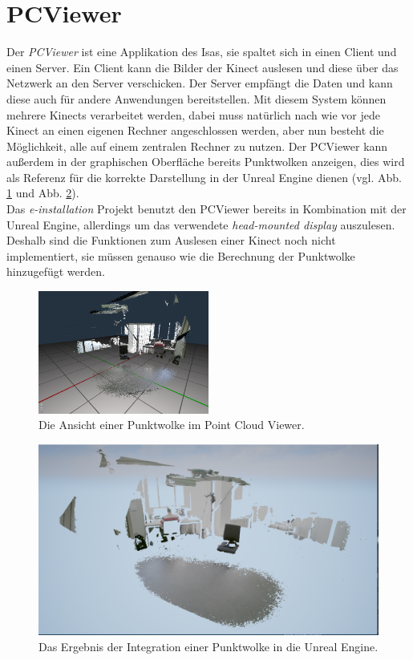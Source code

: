 \documentclass[a4paper]{IEEEtran}
\begin{document}
\section{PCViewer}
	Der {\textit{PCViewer}} ist eine Applikation des Isas, sie spaltet sich in einen Client und einen Server. 
	Ein Client kann die Bilder der Kinect auslesen und diese über das Netzwerk an den Server verschicken. 
	Der Server empfängt die Daten und kann diese auch für andere Anwendungen bereitstellen.
	Mit diesem System können mehrere Kinects verarbeitet werden, dabei muss natürlich nach wie vor jede Kinect an einen eigenen Rechner angeschlossen werden, aber nun besteht die Möglichkeit, alle auf einem zentralen Rechner zu nutzen.
	Der PCViewer kann außerdem in der graphischen Oberfläche bereits Punktwolken anzeigen, dies wird als Referenz für die korrekte Darstellung in der Unreal Engine dienen (vgl. Abb. \ref{CloudPCViewer} und Abb. \ref{Cloud}). \\
	Das {\textit{e-installation}} Projekt benutzt den PCViewer bereits in Kombination mit der Unreal Engine, allerdings um das verwendete {\textit{head-mounted display}} auszulesen. 
	Deshalb sind die Funktionen zum Auslesen einer Kinect noch nicht implementiert, sie müssen genauso wie die Berechnung der Punktwolke hinzugefügt werden. \\[0.5cm]
	
	\begin{figure}[!h]
    	\centering
		\includegraphics[width=0.5\textwidth]{img/CloudPCViewer}
	    \caption{Die Ansicht einer Punktwolke im Point Cloud Viewer.}
    	\label{CloudPCViewer}
	\end{figure}

	\begin{figure}[t]
    	\centering
		\includegraphics[width=\textwidth]{img/Cloud}
	    \caption{Das Ergebnis der Integration einer Punktwolke in die Unreal Engine.}
    	\label{Cloud}
	\end{figure} 
\end{document}
